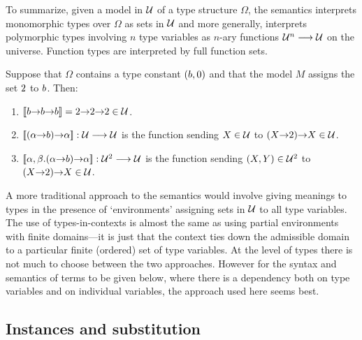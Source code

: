 To summarize, given a model in $\cal U$ of a type structure $\Omega$,
the semantics interprets monomorphic types over $\Omega$ as sets in
$\cal U$ and more generally, interprets polymorphic types involving $n$ type variables as $n$-ary functions ${\cal
U}^{n}\longrightarrow{\cal U}$ on the universe.  Function types are
interpreted by full function sets.

\medskip

Suppose that $\Omega$ contains a type constant $({\sl b},0)$ and that
the model $M$ assigns the set $\mbox{\rm 2}$ to $\sl b$. Then:
\begin{enumerate}

\item $[\![{\sl b}{\to}{\sl b}{\to}{\sl b}]\!]=\mbox{\rm 2}{\to}\mbox{\rm 2}{\to}\mbox{\rm 2}\in{\cal U}$.

\item $[\![(\alpha{\to}{\sl b}){\to}\alpha]\!]:{\cal U}\longrightarrow{\cal U}$
is the function sending $X\in{\cal U}$ to $(X{\to}\mbox{\rm 2}){\to} X\in{\cal U}$.

\item $[\![\alpha,\beta . (\alpha{\to}{\sl b}){\to}\alpha]\!]:{\cal
U}^{2}\longrightarrow{\cal U}$ is the function sending $(X,Y)\in{\cal
U}^{2}$ to $(X{\to}\mbox{\rm 2}){\to} X\in{\cal U}$.

\end{enumerate}

\medskip

A more traditional approach to the semantics would involve giving
meanings to types in the presence of `environments' assigning sets in
$\cal U$ to all type variables. The use of types-in-contexts is almost
the same as using partial environments with finite domains---it is
just that the context ties down the admissible domain to a particular
finite (ordered) set of type variables. At the level of types there is
not much to choose between the two approaches.  However for the syntax
and semantics of terms to be given below, where there is a dependency
both on type variables and on individual variables, the approach used
here seems best.

\subsection{Instances and substitution}
\label{instances-and-substitution}

